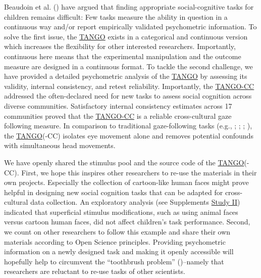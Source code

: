 \documentclass[
]{scrbook}
\begin{document}
Beaudoin et al. () have argued that finding appropriate social-cognitive tasks for children remains difficult: Few tasks measure the ability in question in a continuous way and/or report empirically validated psychometric information. To solve the first issue, the \hyperref[acronyms_TANGO]{TANGO} exists in a categorical and continuous version which increases the flexibility for other interested researchers. Importantly, continuous here means that the experimental manipulation and the outcome measure are designed in a continuous format. To tackle the second challenge, we have provided a detailed psychometric analysis of the \hyperref[acronyms_TANGO]{TANGO} by assessing its validity, internal consistency, and retest reliability. Importantly, the \hyperref[acronyms_TANGO-CC]{TANGO-CC} addressed the often-declared need for new tasks to assess social cognition across diverse communities. Satisfactory internal consistency estimates across 17 communities proved that the \hyperref[acronyms_TANGO-CC]{TANGO-CC} is a reliable cross-cultural gaze following measure. In comparison to traditional gaze-following tasks (e.g., ; ; ; ), the \hyperref[acronyms_TANGO]{TANGO}(-CC) isolates eye movement alone and removes potential confounds with simultaneous head movements.

We have openly shared the stimulus pool and the source code of the \hyperref[acronyms_TANGO]{TANGO}(-CC). First, we hope this inspires other researchers to re-use the materials in their own projects. Especially the collection of cartoon-like human faces might prove helpful in designing new social cognition tasks that can be adapted for cross-cultural data collection. An exploratory analysis (see Supplements \hyperref[studyII]{Study II}) indicated that superficial stimulus modifications, such as using animal faces versus cartoon human faces, did not affect children's task performance. Second, we count on other researchers to follow this example and share their own materials according to Open Science principles. Providing psychometric information on a newly designed task and making it openly accessible will hopefully help to circumvent the ``toothbrush problem'' ()\thinspace --\thinspace namely that researchers are reluctant to re-use tasks of other scientists.
\end{document}
